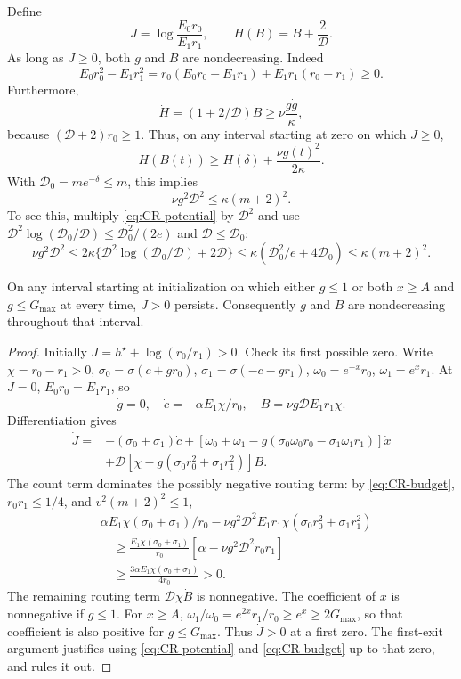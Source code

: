 Define
\[
 J=\log\frac{E_0r_0}{E_1r_1},\qquad
 H(B)=B+\frac{2}{\mathcal D}.
\]
As long as $J\ge0$, both $g$ and $B$ are nondecreasing. Indeed
\[
 E_0r_0^2-E_1r_1^2
 =r_0(E_0r_0-E_1r_1)+E_1r_1(r_0-r_1)\ge0.
\]
Furthermore,
\[
 \dot H=(1+2/\mathcal D)\dot B\ge\nu\frac{g\dot g}{\kappa},
\]
because $(\mathcal D+2)r_0\ge1$. Thus, on any interval starting at zero on which $J\ge0$,
\begin{equation}
 H(B(t))\ge H(\delta)+\frac{\nu g(t)^2}{2\kappa}.
 \label{eq:CR-potential}
\end{equation}
With $\mathcal D_0=me^{-\delta}\le m$, this implies
\begin{equation}
 \nu g^2\mathcal D^2\le\kappa(m+2)^2.
 \label{eq:CR-budget}
\end{equation}
To see this, multiply \eqref{eq:CR-potential} by $\mathcal D^2$ and use
$\mathcal D^2\log(\mathcal D_0/\mathcal D)\le \mathcal D_0^2/(2e)$ and $\mathcal D\le \mathcal D_0$:
\[
 \nu g^2\mathcal D^2\le2\kappa\{\mathcal D^2\log(\mathcal D_0/\mathcal D)+2\mathcal D\}
 \le\kappa(\mathcal D_0^2/e+4\mathcal D_0)\le\kappa(m+2)^2.
\]

\begin{lemma}
\label{lem:CR-monotone}
On any interval starting at initialization on which either $g\le1$ or both $x\ge A$ and $g\le G_{\max}$ at every time,
$J>0$ persists. Consequently $g$ and $B$ are nondecreasing throughout that interval.
\end{lemma}
\begin{proof}
Initially $J=h^\star+\log(r_0/r_1)>0$. Check its first possible zero.
Write $\chi=r_0-r_1>0$, $\sigma_0=\sigma(c+gr_0)$, $\sigma_1=\sigma(-c-gr_1)$,
$\omega_0=e^{-x}r_0$, $\omega_1=e^xr_1$.
At $J=0$, $E_0r_0=E_1r_1$, so
\[
 \dot g=0,\quad \dot c=-\alpha E_1\chi/r_0,\quad
 \dot B=\nu g\mathcal DE_1r_1\chi.
\]
Differentiation gives
\begin{align*}
 \dot J={}&-(\sigma_0+\sigma_1)\dot c
 +[\omega_0+\omega_1-g(\sigma_0\omega_0r_0-\sigma_1\omega_1r_1)]\dot x\\
 &+\mathcal D[\chi-g(\sigma_0r_0^2+\sigma_1r_1^2)]\dot B.
\end{align*}
The count term dominates the possibly negative routing term: by \eqref{eq:CR-budget}, $r_0r_1\le1/4$, and $v^2(m+2)^2\le1$,
\begin{align*}
 &\alpha E_1\chi(\sigma_0+\sigma_1)/r_0
 -\nu g^2\mathcal D^2E_1r_1\chi(\sigma_0r_0^2+\sigma_1r_1^2)\\
 &\hspace{1em}\ge\frac{E_1\chi(\sigma_0+\sigma_1)}{r_0}
       [\alpha-\nu g^2\mathcal D^2r_0r_1]\\
 &\hspace{1em}\ge\frac{3\alpha E_1\chi(\sigma_0+\sigma_1)}{4r_0}>0.
\end{align*}
The remaining routing term $\mathcal D\chi\dot B$ is nonnegative.
The coefficient of $\dot x$ is nonnegative if $g\le1$.
For $x\ge A$, $\omega_1/\omega_0=e^{2x}r_1/r_0\ge e^x\ge2G_{\max}$, so that coefficient is also positive for $g\le G_{\max}$.
Thus $\dot J>0$ at a first zero. The first-exit argument justifies using \eqref{eq:CR-potential} and \eqref{eq:CR-budget} up to that zero, and rules it out.
\end{proof}

